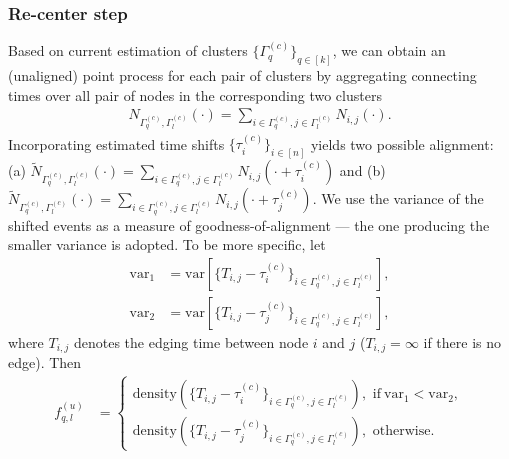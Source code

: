\subsubsection{Re-center step}
Based on current estimation of clusters $\{  \Gamma_q^{(c)} \}_{q\in[k]}$, we can obtain an (unaligned) point process for each pair of clusters by aggregating connecting times over all pair of nodes in the corresponding two clusters
\begin{align*}
N_{\Gamma_q^{(c)}, \Gamma_l^{(c)}}(\cdot) = \sum_{i\in\Gamma_q^{(c)}, j\in\Gamma_l^{(c)}} N_{i,j}(\cdot).
\end{align*}
Incorporating estimated time shifts $\{  \tau_i^{(c)} \}_{i\in [n]}$ yields two possible alignment: 
(a) $\tilde N_{\Gamma_q^{(c)}, \Gamma_l^{(c)}}(\cdot) = \sum_{i\in\Gamma_q^{(c)}, j\in\Gamma_l^{(c)}} N_{i,j}(\cdot+\tau_i^{(c)})$ 
and (b) $\tilde N_{\Gamma_q^{(c)}, \Gamma_l^{(c)}}(\cdot) = \sum_{i\in\Gamma_q^{(c)}, j\in\Gamma_l^{(c)}} N_{i,j}(\cdot+\tau_j^{(c)})$.
We use the variance of the shifted events as a measure of goodness-of-alignment --- the one producing the smaller variance is adopted.
To be more specific, let 
\begin{align*}
\text{var}_1 &= \text{var}\left[\{ T_{i,j}-\tau_i^{(c)} \}_{i\in\Gamma_q^{(c)}, j\in\Gamma_l^{(c)}}\right],
\\
\text{var}_2 &= \text{var}\left[\{ T_{i,j}-\tau_j^{(c)} \}_{i\in\Gamma_q^{(c)}, j\in\Gamma_l^{(c)}}\right],
\end{align*}
where 
$T_{i,j}$ denotes the edging time between node $i$ and $j$ ($T_{i,j}=\infty$ if there is no edge).
Then
\begin{align}
f_{q,l}^{(u)} &= 
\begin{cases}
\text{density}\left(\{T_{i,j}-\tau_i^{(c)} \}_{i\in\Gamma_q^{(c)}, j\in\Gamma_l^{(c)}}\right), \text{ if}~ \text{var}_1 < \text{var}_2,
\\
\text{density}\left(\{T_{i,j}-\tau_j^{(c)} \}_{i\in\Gamma_q^{(c)}, j\in\Gamma_l^{(c)}}\right), \text{ otherwise}.
\end{cases}
\label{eq: update connecting patterns}
\end{align}



